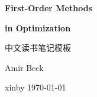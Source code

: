 \begin{titlepage}
  \thispagestyle{empty}
  \vspace*{0.20\textheight}
  {\raggedright
    {\Huge\bfseries First-Order Methods\par}
    \vspace{0.25em}
    {\Huge\bfseries in Optimization\par}
    \vspace{1.6em}
    {\Large 中文读书笔记模板\par}
    \vspace{0.8em}
    {\normalsize Amir Beck\par}
  }
  \vfill
  {\small xinby \qquad \today\par}
\end{titlepage}
